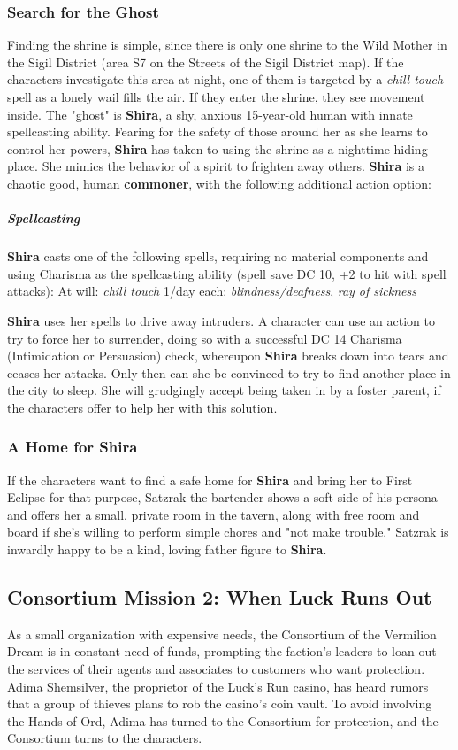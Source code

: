 \documentclass[10pt,a4,twoside,twocolumn,openany,nodeprecatedcode]{dndbook}
\begin{document}
\subsubsection{Search for the Ghost}
Finding the shrine is simple, since there is only one shrine to the Wild Mother in the Sigil District (area S7 on the Streets of the Sigil District map). If the characters investigate this area at night, one of them is targeted by a \textit{chill touch} spell as a lonely wail fills the air. If they enter the shrine, they see movement inside.
The "ghost" is \textbf{Shira}, a shy, anxious 15-year-old human with innate spellcasting ability. Fearing for the safety of those around her as she learns to control her powers, \textbf{Shira} has taken to using the shrine as a nighttime hiding place. She mimics the behavior of a spirit to frighten away others.
\textbf{Shira} is a chaotic good, human \textbf{commoner}, with the following additional action option:
\begin{DndComment}{}
\subparagraph{Spellcasting}
\textbf{Shira} casts one of the following spells, requiring no material components and using Charisma as the spellcasting ability (spell save DC 10, +2 to hit with spell attacks):
At will: \textit{chill touch}
1/day each: \textit{blindness/deafness}, \textit{ray of sickness}
\end{DndComment}

\textbf{Shira} uses her spells to drive away intruders. A character can use an action to try to force her to surrender, doing so with a successful DC 14 Charisma (Intimidation or Persuasion) check, whereupon \textbf{Shira} breaks down into tears and ceases her attacks. Only then can she be convinced to try to find another place in the city to sleep. She will grudgingly accept being taken in by a foster parent, if the characters offer to help her with this solution.
\subsubsection{A Home for Shira}
If the characters want to find a safe home for \textbf{Shira} and bring her to First Eclipse for that purpose, Satzrak the bartender shows a soft side of his persona and offers her a small, private room in the tavern, along with free room and board if she's willing to perform simple chores and "not make trouble." Satzrak is inwardly happy to be a kind, loving father figure to \textbf{Shira}.
\subsection{Consortium Mission 2: When Luck Runs Out}
As a small organization with expensive needs, the Consortium of the Vermilion Dream is in constant need of funds, prompting the faction's leaders to loan out the services of their agents and associates to customers who want protection.
Adima Shemsilver, the proprietor of the Luck's Run casino, has heard rumors that a group of thieves plans to rob the casino's coin vault. To avoid involving the Hands of Ord, Adima has turned to the Consortium for protection, and the Consortium turns to the characters.
\end{document}
